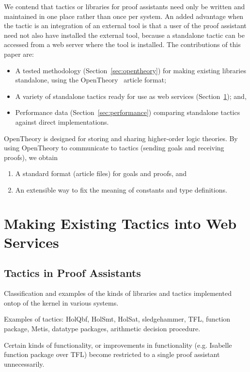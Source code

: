 \documentclass{llncs}
\newcommand{\OpenTheory}{OpenTheory\xspace}
\newcommand{\secref}[1]{Section~\ref{sec:#1}}
\begin{document}
We contend that tactics or libraries for proof assistants need only be written and maintained in one place rather than once per system. 
An added advantage when the tactic is an integration of an external tool is that a user of the proof assistant need not also have installed the external tool, because a standalone tactic can be accessed from a web server where the tool is installed.
The contributions of this paper are:
\begin{itemize}
\item
A tested methodology (\secref{opentheory}) for making existing libraries standalone, using the \OpenTheory~\cite{hurd2009} article format;
\item
A variety of standalone tactics ready for use as web services (\secref{web}); and,
\item
Performance data (\secref{performance}) comparing standalone tactics against direct implementations.
\end{itemize}

OpenTheory is designed for storing and sharing higher-order logic theories.
By using OpenTheory to communicate to tactics (sending goals and receiving proofs), we obtain
\begin{enumerate}
\item
A standard format (article files) for goals and proofs, and
\item
An extensible way to fix the meaning of constants and type definitions.
\end{enumerate}

\section{Making Existing Tactics into Web Services}
\label{sec:web}

\subsection{Tactics in Proof Assistants}

Classification and examples of the kinds of libraries and tactics implemented ontop of the kernel in various systems.

Examples of tactics: HolQbf, HolSmt, HolSat, sledgehammer, TFL, function package, Metis, datatype packages, arithmetic decision procedure.

Certain kinds of functionality, or improvements in functionality (e.g. Isabelle function package over TFL) become restricted to a single proof assistant unnecessarily.
\end{document}
